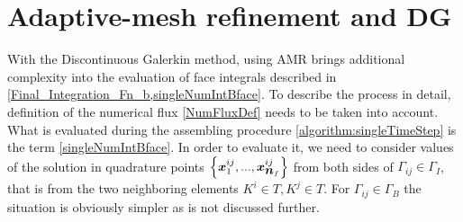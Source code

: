 \section{Adaptive-mesh refinement and DG}
With the Discontinuous Galerkin method, using AMR brings additional complexity into the evaluation of face integrals described in \cref{Final_Integration_Fn_b,singleNumIntBface}.
To describe the process in detail, definition of the numerical flux \cref{NumFluxDef} needs to be taken into account. What is evaluated during the assembling procedure \cref{algorithm:singleTimeStep} is the term \cref{singleNumIntBface}. In order to evaluate it, we need to consider values of the solution in quadrature points $\left\{\mbox{\boldmath $x$}^{ij}_1, ..., \mbox{\boldmath $x$}^{ij}_{\mbox{\boldmath $n$}_f}\right\}$ from both sides of $\Gamma_{ij}\in \Gamma_I$, that is from the two neighboring elements $K^i\in T, K^j\in T$. For $\Gamma_{ij}\in \Gamma_B$ the situation is obviously simpler as is not discussed further.
